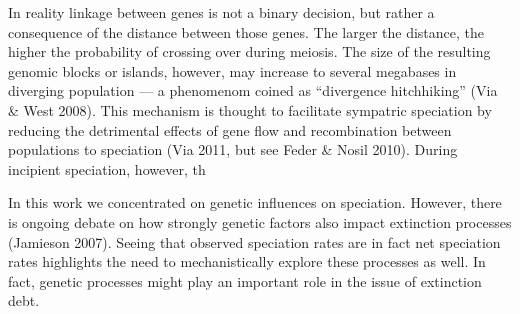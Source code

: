 \documentclass[a4paper]{scrartcl}
\begin{document}
In reality linkage between genes is not a binary decision, but rather a consequence of the distance between those genes.
The larger the distance, the higher the probability of crossing over during meiosis.
The size of the resulting genomic blocks or islands, however, may increase to several megabases in diverging population ---
a phenomenom coined as ``divergence hitchhiking'' (Via \& West 2008). %
This mechanism is thought to facilitate sympatric speciation by reducing the detrimental effects of gene flow and
recombination between populations to speciation (Via 2011, but see Feder \& Nosil 2010).
During incipient speciation, however, th

In this work we concentrated on genetic influences on speciation.
However, there is ongoing debate on how strongly genetic factors also impact extinction processes (Jamieson 2007).
Seeing that observed speciation rates are in fact net speciation rates highlights the need to mechanistically explore
these processes as well.
In fact, genetic processes might play an important role in the issue of extinction debt. %

\printbibliography
\end{document}
